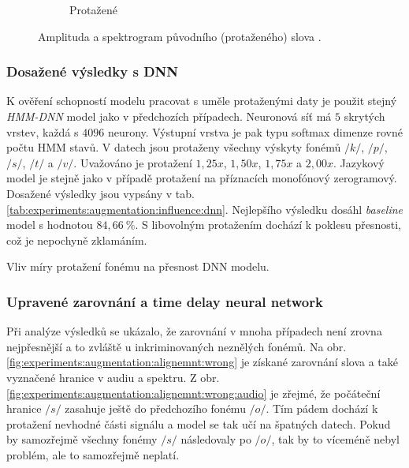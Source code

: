 \begin{figure}[htpb]
\begin{subfigure}[b]{0.42\textwidth}
    \caption{Protažené}
    \label{fig:experiments:augmentation:compare:augmented}
  \end{subfigure}
  \caption{Amplituda a spektrogram původního (protaženého) slova .}
  \label{fig:experiments:augmentation:compare}
\end{figure}

\subsubsection{Dosažené výsledky s DNN}

K ověření schopností modelu pracovat s uměle protaženými daty je použit stejný \textit{HMM-DNN} model jako v předchozích případech. Neuronová síť má $5$ skrytých vrstev, každá s $4096$ neurony. Výstupní vrstva je pak typu softmax dimenze rovné počtu HMM stavů. V datech jsou protaženy všechny výskyty fonémů $/k/$, $/p/$, $/s/$, $/t/$ a $/v/$. Uvažováno je protažení $1,25x$, $1,50x$, $1,75x$ a $2,00x$. Jazykový model je stejně jako v případě protažení na příznacích monofónový zerogramový. Dosažené výsledky jsou vypsány v tab. \ref{tab:experiments:augmentation:influence:dnn}. Nejlepšího výsledku dosáhl \textit{baseline} model s hodnotou $84,66\ \%$. S libovolným protažením dochází k poklesu přesnosti, což je nepochyně zklamáním.

\begin{table}[htpb]
  \centering
  \def\arraystretch{1.5}
  \caption{Vliv míry protažení fonému na přesnost DNN modelu.}
  \label{tab:experiments:augmentation:influence:dnn}
\end{table}

\subsubsection{Upravené zarovnání a time delay neural network}

Při analýze výsledků se ukázalo, že zarovnání v mnoha případech není zrovna nejpřesnější a to zvláště u inkriminovaných neznělých fonémů. Na obr. \ref{fig:experiments:augmentation:alignemnt:wrong} je získané zarovnání slova  a také vyznačené hranice v audiu a spektru. Z obr. \ref{fig:experiments:augmentation:alignemnt:wrong:audio} je zřejmé, že počáteční hranice $/s/$ zasahuje ještě do předchozího fonému $/o/$. Tím pádem dochází k protažení nevhodné části signálu a model se tak učí na špatných datech. Pokud by samozřejmě všechny fonémy $/s/$ následovaly po $/o/$, tak by to víceméně nebyl problém, ale to samozřejmě neplatí.

